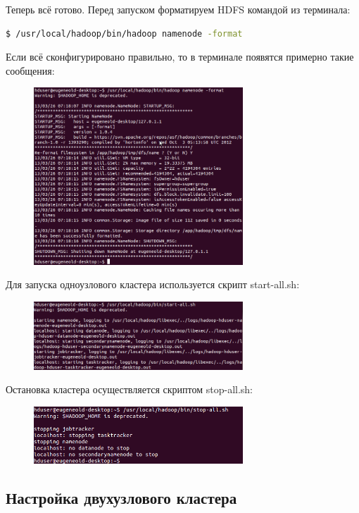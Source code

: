 \documentclass[12pt,a4paper]{extarticle} %
\begin{document}
\noindent Теперь всё готово. Перед запуском форматируем HDFS командой из терминала:
\begin{lstlisting}[language=sh]
    $ /usr/local/hadoop/bin/hadoop namenode -format
\end{lstlisting}
\newpage
\noindent Если всё сконфигурировано правильно, то в терминале появятся примерно такие сообщения:
\begin{figure}[h!]
 \centering
    \includegraphics[width=0.7\textwidth]{images/1.png}
\end{figure}

\noindent Для запуска одноузлового кластера используется скрипт start-all.sh:
\begin{figure}[h!]
 \centering
    \includegraphics[width=0.7\textwidth]{images/2.png}
\end{figure}

\noindent Остановка кластера осуществляется скриптом stop-all.sh:
\begin{figure}[h]
 \centering
    \includegraphics[width=0.7\textwidth]{images/3.png}
\end{figure}

\clearpage\newpage
\subsection{Настройка двухузлового кластера}
\end{document}
